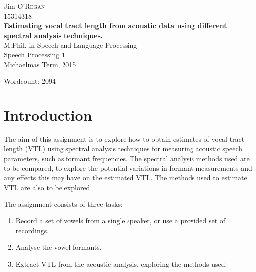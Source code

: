 \documentclass[11pt]{article}
\begin{document}
\begin{titlepage}

\newcommand{\HRule}{\rule{\linewidth}{0.5mm}}

\center

\begin{minipage}{0.8\textwidth}
\begin{flushleft} \large
Jim \textsc{O'Regan}
\\
{\large 15314318} \\[1.5cm]

{ \large \bfseries Estimating vocal tract length from acoustic data using different spectral analysis techniques.}\\[1.5cm]

M.Phil. in Speech and Language Processing
\\
{\large Speech Processing 1} \\
{\large Michaelmas Term, 2015}
\end{flushleft}
\end{minipage}

\begin{minipage}[t][10cm][b]{0.5\textwidth}
\begin{flushleft} \large
Wordcount: 2094
\\
\end{flushleft}
\end{minipage}


\vfill

\end{titlepage}

\section{Introduction}

The aim of this assignment is to explore how to obtain estimates of vocal tract length (VTL) using spectral analysis techniques for measuring acoustic speech parameters, such as formant frequencies. The spectral analysis methods used are to be compared, to explore the potential variations in formant measurements and any effects this may have on the estimated VTL. The methods used to estimate VTL are also to be explored.

The assignment consists of three tasks:

\begin{enumerate}
\item Record a set of vowels from a single speaker, or use a provided set of recordings.
\item Analyse the vowel formants.
\item Extract VTL from the acoustic analysis, exploring the methods used.
\end{enumerate}
\end{document}

